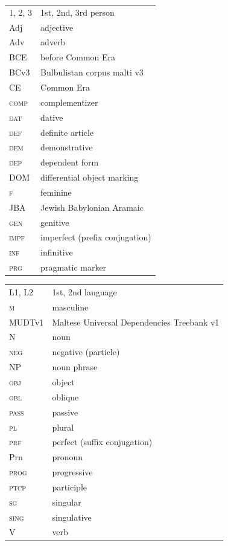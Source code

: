 \documentclass[output=paper]{langsci/langscibook}
\begin{document}
\begin{tabularx}{.5\textwidth}[t]{@{}lQ@{}}
\textsc{1, 2, 3} & 1st, 2nd, 3rd person \\
Adj & adjective \\
Adv & adverb \\
BCE & before Common Era \\
\textsc BCv3 & Bulbulistan corpus malti v3 \\
CE & Common Era \\
\textsc{comp} & {complementizer} \\
\textsc{dat} & dative \\
\textsc{def} & {definite} {article} \\
\textsc{dem} & demonstrative \\
\textsc{dep} & dependent form \\
{DOM} & {differential object marking} \\
\textsc{f} & feminine \\
JBA & Jewish Babylonian Aramaic \\
\textsc{gen} & genitive \\
\textsc{impf} & imperfect (prefix conjugation) \\
\textsc{inf} & {infinitive} \\
\textsc{prg} & pragmatic marker \\
\end{tabularx}%
\begin{tabularx}{.5\textwidth}[t]{@{}lQ@{}}
\textsc{L1, L2} & 1st, 2nd language \\
\textsc{m} & masculine \\
MUDTv1 & Maltese Universal Dependencies Treebank v1 \\
N & noun \\
\textsc{neg} & negative (particle) \\
NP & {noun phrase}\\
\textsc{obj} & object \\
\textsc{obl} & oblique \\
\textsc{pass} & passive \\
\textsc{pl} & plural \\
\textsc{prf} & perfect (suffix conjugation) \\
Prn & pronoun \\
\textsc{prog} & progressive \\
\textsc{ptcp} & {participle} \\
\textsc{sg} & singular \\
\textsc{sing} & singulative \\
V & verb \\
\end{tabularx}%
\end{document}
